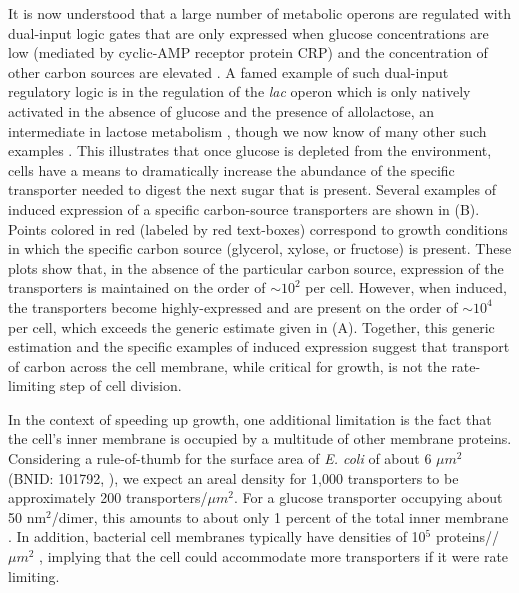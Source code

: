 It is now understood that a large number of metabolic operons are regulated
with dual-input logic gates that are only expressed when glucose
concentrations are low (mediated by cyclic-AMP receptor protein CRP) and the
concentration of other carbon sources are elevated \citep{gama-castro2016, zhang2014a}. A
famed example of such dual-input regulatory logic is in the regulation of the
\textit{lac} operon which is only natively activated in the absence of glucose and the
presence of allolactose, an intermediate in lactose metabolism \citep{jacob1961}, though
we now know of many other such examples \citep{ireland2020, gama-castro2016,
belliveau2018}. This illustrates that once glucose is depleted from the
environment, cells have a means to dramatically increase the abundance of the
specific transporter needed to digest the next sugar that is present. Several
examples of induced expression of a specific carbon-source transporters are
shown in (B). Points colored in red (labeled by red
text-boxes) correspond to growth conditions in which the specific carbon source
(glycerol, xylose, or fructose) is present. These plots show that, in the
absence of the particular carbon source, expression of the transporters is
maintained on the order of $\sim 10^2$ per cell. However, when induced, the
transporters become highly-expressed and are present on the order of $\sim
10^4$ per cell, which exceeds the generic estimate given in
(A). Together, this generic estimation and the specific
examples of induced expression suggest that transport of carbon across the cell
membrane, while critical for growth, is not the rate-limiting step of cell division.

In the context of speeding up growth, one additional limitation  is the fact
that the cell's inner membrane is occupied by a multitude of other
membrane proteins. Considering a rule-of-thumb for the surface area of
\textit{E. coli} of about 6 $\mu m^2$ (BNID: 101792, \cite{milo2010}), we expect
an areal density for 1,000 transporters to be approximately 200
transporters/$\mu m^2$. For a glucose transporter occupying about 50
nm$^2$/dimer, this amounts to about only 1 percent of the total inner membrane
\citep{szenk2017}. In addition, bacterial cell membranes typically have
densities of 10$^5$ proteins//$\mu m^2$ \citep{phillips2018}, implying that the
cell could accommodate more transporters if it were rate limiting.


